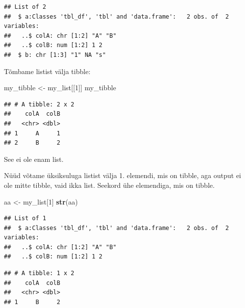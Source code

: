 \documentclass[]{book}
\newenvironment{Shaded}{\begin{snugshade}}{\end{snugshade}}
\newcommand{\KeywordTok}[1]{\textcolor[rgb]{0.13,0.29,0.53}{\textbf{#1}}}
\newcommand{\DecValTok}[1]{\textcolor[rgb]{0.00,0.00,0.81}{#1}}
\newcommand{\StringTok}[1]{\textcolor[rgb]{0.31,0.60,0.02}{#1}}
\newcommand{\CommentTok}[1]{\textcolor[rgb]{0.56,0.35,0.01}{\textit{#1}}}
\newcommand{\OperatorTok}[1]{\textcolor[rgb]{0.81,0.36,0.00}{\textbf{#1}}}
\newcommand{\NormalTok}[1]{#1}
\begin{document}
\begin{verbatim}
## List of 2
##  $ a:Classes 'tbl_df', 'tbl' and 'data.frame':   2 obs. of  2 variables:
##   ..$ colA: chr [1:2] "A" "B"
##   ..$ colB: num [1:2] 1 2
##  $ b: chr [1:3] "1" NA "s"
\end{verbatim}

Tõmbame listist välja tibble:

\begin{Shaded}
\begin{Highlighting}[]
\NormalTok{my_tibble <-}\StringTok{ }\NormalTok{my_list[[}\DecValTok{1}\NormalTok{]]}
\NormalTok{my_tibble}
\end{Highlighting}
\end{Shaded}

\begin{verbatim}
## # A tibble: 2 x 2
##    colA  colB
##   <chr> <dbl>
## 1     A     1
## 2     B     2
\end{verbatim}

See ei ole enam list.

Nüüd võtame üksiksuluga listist välja 1. elemendi, mis on tibble, aga
output ei ole mitte tibble, vaid ikka list. Seekord ühe elemendiga, mis
on tibble.

\begin{Shaded}
\begin{Highlighting}[]
\NormalTok{aa <-}\StringTok{ }\NormalTok{my_list[}\DecValTok{1}\NormalTok{]}
\KeywordTok{str}\NormalTok{(aa)}
\end{Highlighting}
\end{Shaded}

\begin{verbatim}
## List of 1
##  $ a:Classes 'tbl_df', 'tbl' and 'data.frame':   2 obs. of  2 variables:
##   ..$ colA: chr [1:2] "A" "B"
##   ..$ colB: num [1:2] 1 2
\end{verbatim}

\begin{Shaded}
\end{Shaded}

\begin{verbatim}
## # A tibble: 1 x 2
##    colA  colB
##   <chr> <dbl>
## 1     B     2
\end{verbatim}
\end{document}
